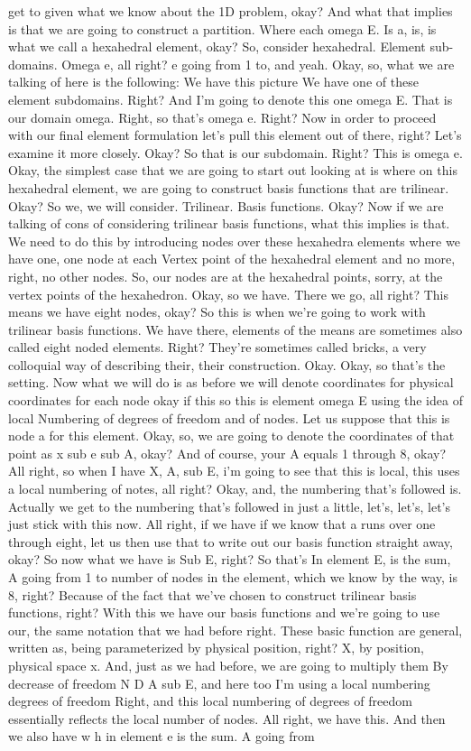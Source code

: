 \documentclass[10pt]{article}
\begin{document}
get to given what we know about the 1D problem, okay? And what that implies is that we are going to construct a partition. Where each omega E. Is a, is, is what we call a hexahedral element, okay? So, consider hexahedral. Element sub-domains. Omega e, all right? e going from 1 to, and yeah. Okay, so, what we are talking of here is the following: We have this picture We have one of these element subdomains. Right? And I'm going to denote this one omega E. That is our domain omega. Right, so that's omega e. Right? Now in order to proceed with our final element formulation let's pull this element out of there, right? Let's examine it more closely. Okay? So that is our subdomain. Right? This is omega e. Okay, the simplest case that we are going to start out looking at is where on this hexahedral element, we are going to construct basis functions that are trilinear. Okay? So we, we will consider. Trilinear. Basis functions. Okay? Now if we are talking of cons of considering trilinear basis functions, what this implies is that. We need to do this by introducing nodes over these hexahedra elements where we have one, one node at each Vertex point of the hexahedral element and no more, right, no other nodes. So, our nodes are at the hexahedral points, sorry, at the vertex points of the hexahedron. Okay, so we have. There we go, all right? This means we have eight nodes, okay? So this is when we're going to work with trilinear basis functions. We have there, elements of the means are sometimes also called eight noded elements. Right? They're sometimes called bricks, a very colloquial way of describing their, their construction. Okay. Okay, so that's the setting. Now what we will do is as before we will denote coordinates for physical coordinates for each node okay if this so this is element omega E using the idea of local Numbering of degrees of freedom and of nodes. Let us suppose that this is node a for this element. Okay, so, we are going to denote the coordinates of that point as x sub e sub A, okay? And of course, your A equals 1 through 8, okay? All right, so when I have X, A, sub E, i'm going to see that this is local, this uses a local numbering of notes, all right? Okay, and, the numbering that's followed is. Actually we get to the numbering that's followed in just a little, let's, let's, let's just stick with this now. All right, if we have if we know that a runs over one through eight, let us then use that to write out our basis function straight away, okay? So now what we have is Sub E, right? So that's In element E, is the sum, A going from 1 to number of nodes in the element, which we know by the way, is 8, right? Because of the fact that we've chosen to construct trilinear basis functions, right? With this we have our basis functions and we're going to use our, the same notation that we had before right. These basic function are general, written as, being parameterized by physical position, right? X, by position, physical space x. And, just as we had before, we are going to multiply them By decrease of freedom N D A sub E, and here too I'm using a local numbering degrees of freedom Right, and this local numbering of degrees of freedom essentially reflects the local number of nodes. All right, we have this. And then we also have w h in element e is the sum. A going from 
\end{document}
